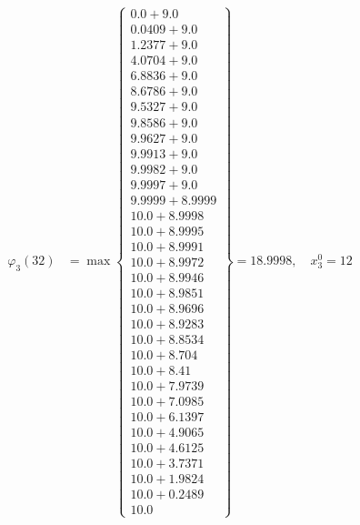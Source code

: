 \documentclass{article}
\begin{document}
\begin{align*}
\varphi_{3}(32) &= \max \left\{ \begin{array}{c}
0.0 + 9.0 \\
 0.0409 + 9.0 \\
 1.2377 + 9.0 \\
 4.0704 + 9.0 \\
 6.8836 + 9.0 \\
 8.6786 + 9.0 \\
 9.5327 + 9.0 \\
 9.8586 + 9.0 \\
 9.9627 + 9.0 \\
 9.9913 + 9.0 \\
 9.9982 + 9.0 \\
 9.9997 + 9.0 \\
 9.9999 + 8.9999 \\
 10.0 + 8.9998 \\
 10.0 + 8.9995 \\
 10.0 + 8.9991 \\
 10.0 + 8.9972 \\
 10.0 + 8.9946 \\
 10.0 + 8.9851 \\
 10.0 + 8.9696 \\
 10.0 + 8.9283 \\
 10.0 + 8.8534 \\
 10.0 + 8.704 \\
 10.0 + 8.41 \\
 10.0 + 7.9739 \\
 10.0 + 7.0985 \\
 10.0 + 6.1397 \\
 10.0 + 4.9065 \\
 10.0 + 4.6125 \\
 10.0 + 3.7371 \\
 10.0 + 1.9824 \\
 10.0 + 0.2489 \\
 10.0
\end{array} \right\}=18.9998, \quad x_{3}^0=12\\
  

\end{align*}
\end{document}
